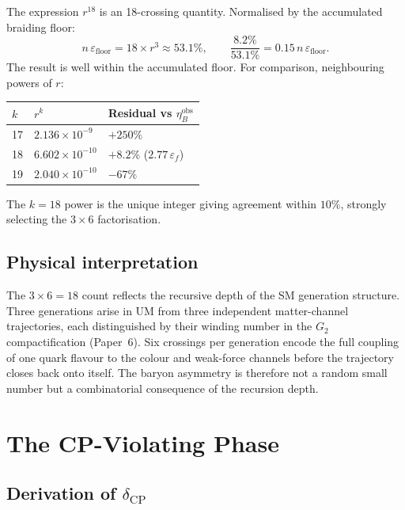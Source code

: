 \documentclass[12pt]{article}
\begin{document}
The expression $r^{18}$ is an 18-crossing quantity. Normalised by the
accumulated braiding floor:
\[
  n\,\varepsilon_{\text{floor}} = 18 \times r^3 \approx 53.1\%,
  \qquad
  \frac{8.2\%}{53.1\%} = 0.15\,n\,\varepsilon_{\text{floor}}.
\]
The result is well within the accumulated floor. For comparison, neighbouring powers of $r$:

\begin{center}
\begin{tabular}{lll}
\toprule
$k$ & $r^k$ & Residual vs $\eta_B^{\text{obs}}$ \\
\midrule
17 & $2.136 \times 10^{-9}$ & $+250\%$ \\
18 & $6.602 \times 10^{-10}$ & $+8.2\%$ \quad ($2.77\,\varepsilon_f$)\\
19 & $2.040 \times 10^{-10}$ & $-67\%$ \\
\bottomrule
\end{tabular}
\end{center}

The $k = 18$ power is the unique integer giving agreement within
$10\%$, strongly selecting the $3 \times 6$ factorisation.

\subsection{Physical interpretation}

The $3 \times 6 = 18$ count reflects the recursive depth of the SM
generation structure. Three generations arise in UM from three
independent matter-channel trajectories, each distinguished by their
winding number in the $G_2$ compactification (Paper~6). Six crossings
per generation encode the full coupling of one quark flavour to the
colour and weak-force channels before the trajectory closes back onto
itself. The baryon asymmetry is therefore not a random small number
but a combinatorial consequence of the recursion depth.

\section{The CP-Violating Phase}

\subsection{Derivation of $\delta_{\text{CP}}$}
\end{document}
